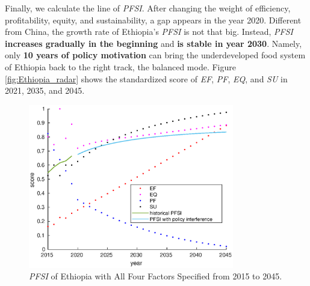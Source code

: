 \documentclass[12pt]{article}
\begin{document}
Finally, we calculate the line of \textit{PFSI}. After changing the weight of efficiency, profitability, equity, and sustainability, a gap appears in the year 2020. Different from China, the growth rate of Ethiopia's \textit{PFSI} is not that big. Instead, \textit{PFSI} \textbf{increases gradually in the beginning} and \textbf{is stable in year 2030}. Namely, only \textbf{10 years of policy motivation} can bring the underdeveloped food system of Ethiopia back to the right track, the balanced mode. Figure \ref{fig:Ethiopia_radar} shows the standardized score of \textit{EF}, \textit{PF}, \textit{EQ}, and \textit{SU} in 2021, 2035, and 2045.
\begin{figure}[!htb]
    \centering
    \begin{minipage}[t]{0.48\textwidth}
        \centering
        \includegraphics[width = 0.8\textwidth]{figure/model/Ethiopia/Ethiopia_score.eps}
        \caption{\textit{PFSI} of Ethiopia with All Four Factors Specified from 2015 to 2045.\label{fig:Ethiopia_score}}
    \end{minipage}
    \begin{minipage}[t]{0.48\textwidth}
        \centering

\end{minipage}
\end{figure}
\end{document}
